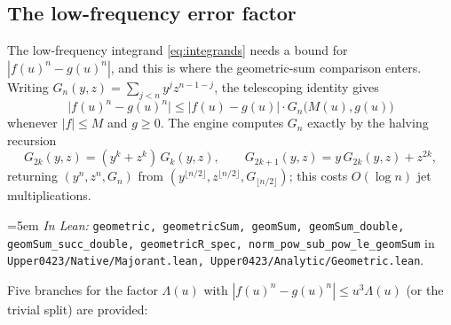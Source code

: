 \documentclass[11pt,a4paper]{article}
\theoremstyle{definition}
\newcommand{\Lean}[1]{\texttt{#1}}
\newcommand{\file}[1]{\texttt{#1}}
\newcommand{\formal}[2]{%
  \par\smallskip
  \begingroup\small\raggedright\emergencystretch=5em
  \noindent\textit{In Lean:} \Lean{#1} in \file{#2}.\par
  \endgroup\smallskip}
\begin{document}
\subsection{The low-frequency error factor}
\label{sec:lowfactor}

The low-frequency integrand \eqref{eq:integrands} needs a bound for
$|f(u)^n-g(u)^n|$, and this is where the geometric-sum comparison enters. Writing
$G_n(y,z)=\sum_{j<n}y^jz^{n-1-j}$, the telescoping identity gives
\begin{equation}
  \label{eq:telescope}
  \bigl|f(u)^n-g(u)^n\bigr|\le\bigl|f(u)-g(u)\bigr|\cdot G_n\bigl(M(u),g(u)\bigr)
\end{equation}
whenever $|f|\le M$ and $g\ge0$. The engine computes $G_n$ exactly by the
halving recursion
\[
  G_{2k}(y,z)=(y^k+z^k)\,G_k(y,z),\qquad
  G_{2k+1}(y,z)=y\,G_{2k}(y,z)+z^{2k},
\]
returning $(y^n,z^n,G_n)$ from $(y^{\lfloor n/2\rfloor},z^{\lfloor n/2\rfloor},
G_{\lfloor n/2\rfloor})$; this costs $O(\log n)$ jet multiplications.
\formal{geometric, geometricSum, geomSum, geomSum\_double, geomSum\_succ\_double, geometricR\_spec, norm\_pow\_sub\_pow\_le\_geomSum}{Upper0423/Native/Majorant.lean, Upper0423/Analytic/Geometric.lean}

Five branches for the factor $\Lambda(u)$ with
$|f(u)^n-g(u)^n|\le u^3\Lambda(u)$ (or the trivial split) are provided:
\end{document}
